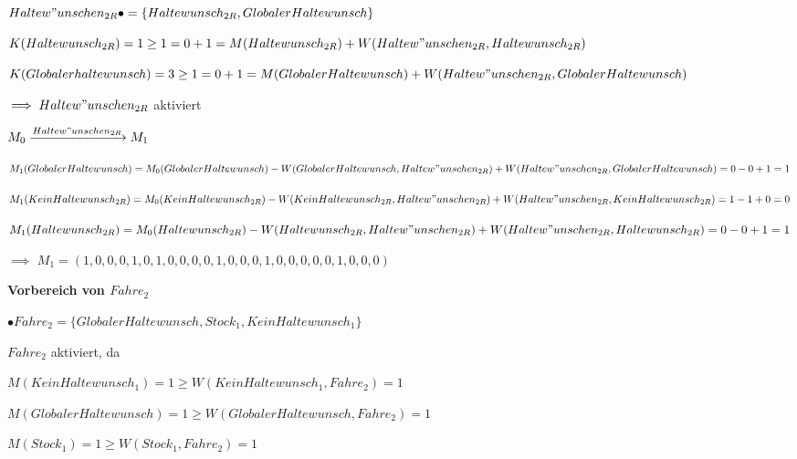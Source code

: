 \documentclass{scrreprt}
\begin{document}
\begin{enumerate}
\begin{addmargin}[1cm]{0cm}
  $Haltew"unschen_{2R} \bullet = \{ Haltewunsch_{2R}, GlobalerHaltewunsch \}$

  $K(Haltewunsch_{2R}) = 1 \geq 1 = 0 + 1 = M(Haltewunsch_{2R}) + \\ W(Haltew"unschen_{2R}, Haltewunsch_{2R})$

  $K(Globalerhaltewunsch) = 3 \geq 1 = 0 + 1 = M(GlobalerHaltewunsch) + W(Haltew"unschen_{2R}, GlobalerHaltewunsch)$

  $\implies Haltew"unschen_{2R}$ aktiviert
\end{addmargin}


$M_0 \xrightarrow{Haltew"unschen_{2R}} M_1$

\begin{addmargin}[1cm]{0cm}
  $M_1(GlobalerHaltewunsch) = M_0(GlobalerHaltewunsch) - \\ W(GlobalerHaltewunsch, Haltew"unschen_{2R}) + \\ W(Haltew"unschen_{2R}, GlobalerHaltewunsch) = 0 - 0 + 1 = 1$

  $M_1(KeinHaltewunsch_{2R}) = M_0(KeinHaltewunsch_{2R}) - \\ W(KeinHaltewunsch_{2R}, Haltew"unschen_{2R}) + \\ W(Haltew"unschen_{2R}, KeinHaltewunsch_{2R}) = 1 - 1 + 0 = 0$

  $M_1(Haltewunsch_{2R}) = M_0(Haltewunsch_{2R}) - \\ W(Haltewunsch_{2R}, Haltew"unschen_{2R}) + \\ W(Haltew"unschen_{2R}, Haltewunsch_{2R}) = 0 - 0 + 1 = 1$

  $\implies$ 
  $M_1 = (
  1, 0, 0, 0, 1, 
  0, 1, 0, 0, 0, 
  0, 1, 0, 0, 0, 
  1, 0, 0, 0, 0, 
  0, 1, 0, 0, 0
  )$
\end{addmargin}


\textbf{Vorbereich von $Fahre_2$}

\begin{addmargin}[1cm]{0cm}
  $\bullet Fahre_2 = \{ GlobalerHaltewunsch, Stock_1, KeinHaltewunsch_1 \}$

  $Fahre_2$ aktiviert, da

  $M(KeinHaltewunsch_1) = 1 \geq W(KeinHaltewunsch_1, Fahre_2) = 1$  

  $M(GlobalerHaltewunsch) = 1 \geq W(GlobalerHaltewunsch, Fahre_2) = 1$

  $M(Stock_1) = 1 \geq W(Stock_1, Fahre_2) = 1$
\end{addmargin}


\end{enumerate}
\end{document}
